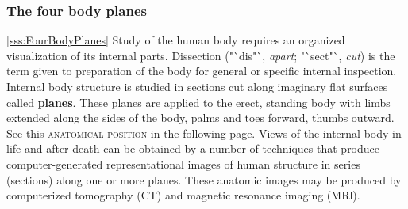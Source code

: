 % 
% 		
% 
% 		
% 		
% 

\subsubsection*{The four body planes}\ref{sss:FourBodyPlanes}
Study of the human body requires an organized visualization of its internal parts. Dissection ("`dis"`, \textit{apart}; "`sect"`, \textit{cut}) is the term given to preparation of the body for general or specific internal inspection. Internal body structure is studied in sections cut along imaginary flat surfaces called \textbf{planes}. These planes are applied to the erect, standing body with limbs extended along the sides of the body, palms and toes forward, thumbs outward. See this \textsc{anatomical position }in the following page. Views of the internal body in life and after death can be obtained by a number of techniques that produce computer-generated representational images of human structure in series (sections) along one or more planes. These anatomic images may be produced by computerized tomography (CT) and magnetic resonance imaging (MRl). 

